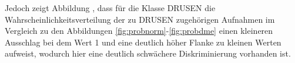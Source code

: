 \setcounter{subfigure}{0} 
 Jedoch zeigt Abbildung \label{fig:probdrusen}, dass für die Klasse DRUSEN die Wahrscheinlichkeitsverteilung der zu DRUSEN zugehörigen Aufnahmen im Vergleich zu den Abbildungen \ref{fig:probnorm}-\ref{fig:probdme} einen kleineren Ausschlag bei dem Wert 1 und eine deutlich höher Flanke zu kleinen Werten aufweist, wodurch hier eine deutlich schwächere Diskriminierung vorhanden ist.  
 


